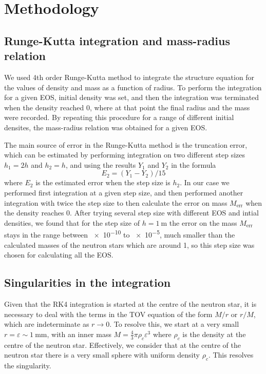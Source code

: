 \documentclass[draft,11pt]{article}
\theoremstyle{definition}
\theoremstyle{remark}
\begin{document}
    \section{Methodology}
        \subsection{Runge-Kutta integration and mass-radius relation}
            We used 4th order Runge-Kutta method to integrate the structure equation for the values of density and mass as a function of radius. To perform the integration for a given EOS, initial density was set, and then the integration was terminated when the density reached 0, where at that point the final radius and the mass were recorded. By repeating this procedure for a range of different initial densites, the mass-radius relation was obtained for a given EOS.
            
            The main source of error in the Runge-Kutta method is the truncation error, which can be estimated by performing integration on two different step sizes $h_{1}=2h$ and $h_{2}=h$, and using the results $Y_{1}$ and $Y_{2}$ in the formula  \parencite{lotkin.1951/rk.accuracy} \[E_{2}=(Y_{1}-Y_{2})/15\] where $E_{2}$ is the estimated error when the step size is $h_{2}$. In our case we performed first integration at a given step size, and then performed another integration with twice the step size to then calculate the error on mass $M_{\text{err}}$ when the density reaches 0. After trying several step size with different EOS and intial densities, we found that for the step size of $h=\SI{1}{\meter}$ the error on the mass $M_{\text{err}}$ stays in the range between \SI{e-10}{\solarmass} to \SI{e-5}{\solarmass}, much smaller than the calculated masses of the neutron stars which are around \SI{1}{\solarmass}, so this step size was chosen for calculating all the EOS.
            
        \subsection{Singularities in the integration}
            Given that the RK4 integration is started at the centre of the neutron star, it is necessary to deal with the terms in the TOV equation of the form $M/r$ or $r/M$, which are indeterminate as $r\to0$. To resolve this, we start at a very small $r=\varepsilon\sim\SI{1}{\milli\meter}$, with an inner mass $M=\frac{4}{3}\pi\rho_{c}\varepsilon^{3}$ where $\rho_{c}$ is the density at the centre of the neutron star. Effectively, we consider that at the centre of the neutron star there is a very small sphere with uniform density $\rho_{c}$. This resolves the singularity.
            
\end{document}
